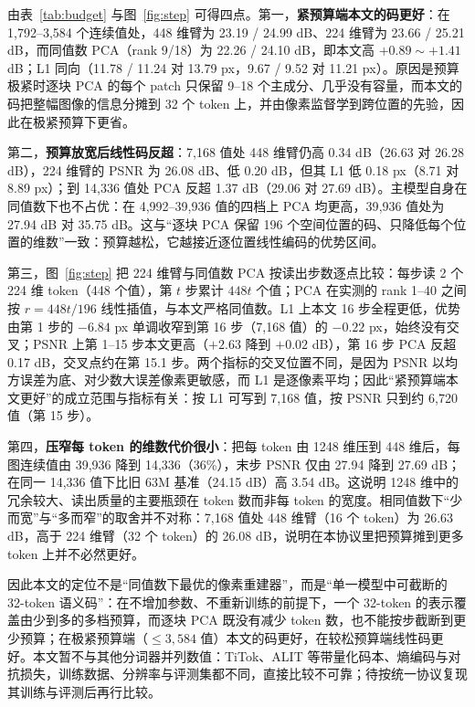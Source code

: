 由表~\ref{tab:budget} 与图~\ref{fig:step} 可得四点。第一，\textbf{紧预算端本文的码更好}：在 1{,}792--3{,}584 个连续值处，448 维臂为 23.19 / 24.99 dB、224 维臂为 23.66 / 25.21 dB，而同值数 PCA（rank 9/18）为 22.26 / 24.10 dB，即本文高 $+0.89\sim+1.41$ dB；L1 同向（11.78 / 11.24 对 13.79 px，9.67 / 9.52 对 11.21 px）。原因是预算极紧时逐块 PCA 的每个 patch 只保留 9--18 个主成分、几乎没有容量，而本文的码把整幅图像的信息分摊到 32 个 token 上，并由像素监督学到跨位置的先验，因此在极紧预算下更省。

第二，\textbf{预算放宽后线性码反超}：7{,}168 值处 448 维臂仍高 0.34 dB（26.63 对 26.28 dB），224 维臂的 PSNR 为 26.08 dB、低 0.20 dB，但其 L1 低 0.18 px（8.71 对 8.89 px）；到 14{,}336 值处 PCA 反超 1.37 dB（29.06 对 27.69 dB）。主模型自身在同值数下也不占优：在 4{,}992--39{,}936 值的四档上 PCA 均更高，39{,}936 值处为 27.94 dB 对 35.75 dB。这与“逐块 PCA 保留 196 个空间位置的码、只降低每个位置的维数”一致：预算越松，它越接近逐位置线性编码的优势区间。

第三，图~\ref{fig:step} 把 224 维臂与同值数 PCA 按读出步数逐点比较：每步读 2 个 224 维 token（448 个值），第 $t$ 步累计 $448t$ 个值；PCA 在实测的 rank 1--40 之间按 $r=448t/196$ 线性插值，与本文严格同值数。L1 上本文 16 步全程更低，优势由第 1 步的 $-6.84$ px 单调收窄到第 16 步（7{,}168 值）的 $-0.22$ px，始终没有交叉；PSNR 上第 1--15 步本文更高（$+2.63$ 降到 $+0.02$ dB），第 16 步 PCA 反超 0.17 dB，交叉点约在第 15.1 步。两个指标的交叉位置不同，是因为 PSNR 以均方误差为底、对少数大误差像素更敏感，而 L1 是逐像素平均；因此“紧预算端本文更好”的成立范围与指标有关：按 L1 可写到 7{,}168 值，按 PSNR 只到约 6{,}720 值（第 15 步）。

第四，\textbf{压窄每 token 的维数代价很小}：把每 token 由 1248 维压到 448 维后，每图连续值由 39{,}936 降到 14{,}336（36\%），末步 PSNR 仅由 27.94 降到 27.69 dB；在同一 14{,}336 值下比旧 63M 基准（24.15 dB）高 3.54 dB。这说明 1248 维中的冗余较大、读出质量的主要瓶颈在 token 数而非每 token 的宽度。相同值数下“少而宽”与“多而窄”的取舍并不对称：7{,}168 值处 448 维臂（16 个 token）为 26.63 dB，高于 224 维臂（32 个 token）的 26.08 dB，说明在本协议里把预算摊到更多 token 上并不必然更好。

因此本文的定位不是“同值数下最优的像素重建器”，而是“单一模型中可截断的 32-token 语义码”：在不增加参数、不重新训练的前提下，一个 32-token 的表示覆盖由少到多的多档预算，而逐块 PCA 既没有减少 token 数，也不能按步截断到更少预算；在极紧预算端（$\le3{,}584$ 值）本文的码更好，在较松预算端线性码更好。本文暂不与其他分词器并列数值：TiTok、ALIT 等带量化码本、熵编码与对抗损失，训练数据、分辨率与评测集都不同，直接比较不可靠；待按统一协议复现其训练与评测后再行比较。

